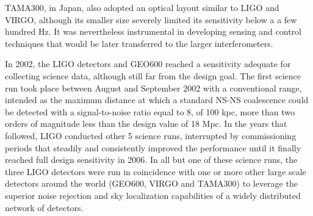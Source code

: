 TAMA300\cite{Ando_2002}, in Japan, also adopted an optical layout similar to LIGO and VIRGO, although its smaller size severely limited its sensitivity below a a few hundred Hz.
It was nevertheless instrumental in developing sensing and control techniques that would be later transferred to the larger interferometers.

In 2002, the LIGO detectors and GEO600 reached a sensitivity adequate for collecting science data, although still far from the design goal.
The first science run took place between August and September 2002 with a conventional range, intended as the maximum distance at which a standard NS-NS coalescence could be detected with a signal-to-noise ratio equal to 8, of 100 kpc, more than two orders of magnitude less than the design value of 18 Mpc.
In the years that followed, LIGO conducted other 5 science runs, interrupted by commissioning periods that steadily and consistently improved the performance until it finally reached full design sensitivity in 2006.
In all but one of these science runs, the three LIGO detectors were run in coincidence with one or more other large scale detectors around the world (GEO600, VIRGO and TAMA300) to leverage the superior noise rejection and sky localization capabilities of a widely distributed network of detectors\cite{Abbott_2004,Abbott_2005,Abbott_2006,Abbott_2008,Abadie_2010}.

